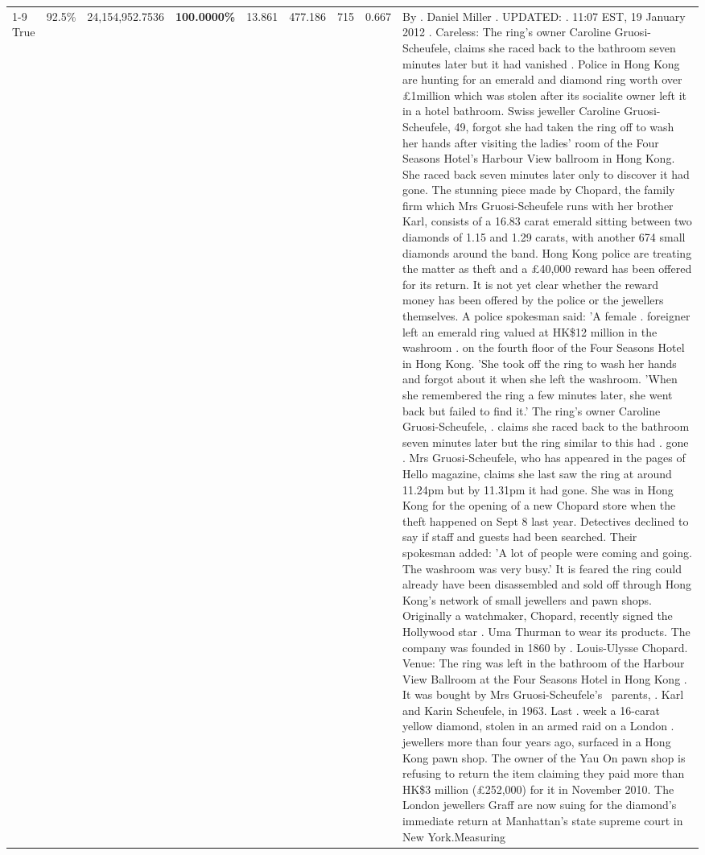 \begin{table}[H]
\begin{tabular}{lllrlllll}
\cline{1-9}
True & 92.5\% & 24,154,952.7536 & \bfseries \color{red} 100.0000\% & 13.861 & 477.186 & 715 & 0.667 & By . Daniel Miller . UPDATED: . 11:07 EST, 19 January 2012 . Careless: The ring's owner Caroline Gruosi-Scheufele, claims she raced back to the bathroom seven minutes later but it had vanished . Police in Hong Kong are hunting for an emerald and diamond ring worth over £1million which was stolen after its socialite owner left it in a hotel bathroom. Swiss jeweller Caroline Gruosi-Scheufele, 49, forgot she had taken the ring off to wash her hands after visiting the ladies' room of the Four Seasons Hotel's Harbour View ballroom in Hong Kong. She raced back seven minutes later only to discover it had gone. The stunning piece made by Chopard, the family firm which Mrs Gruosi-Scheufele runs with her brother Karl, consists of a 16.83 carat emerald sitting between two diamonds of 1.15 and 1.29 carats, with another 674 small diamonds around the band. Hong Kong police are treating the matter as theft and a £40,000 reward has been offered for its return. It is not yet clear whether the reward money has been offered by the police or the jewellers themselves. A police spokesman said: 'A female . foreigner left an emerald ring valued at HK\$12 million in the washroom . on the fourth floor of the Four Seasons Hotel in Hong Kong. 'She took off the ring to wash her hands and forgot about it when she left the washroom. 'When she remembered the ring a few minutes later, she went back but failed to find it.' The ring's owner Caroline Gruosi-Scheufele, . claims she raced back to the bathroom seven minutes later but the ring similar to this had . gone . Mrs Gruosi-Scheufele, who has appeared in the pages of Hello magazine, claims she last saw the ring at around 11.24pm but by 11.31pm it had gone. She was in Hong Kong for the opening of a new Chopard store when the theft happened on Sept 8 last year. Detectives declined to say if staff and guests had been searched. Their spokesman added: 'A lot of people were coming and going. The washroom was very busy.' It is feared the ring could already have been disassembled and sold off through Hong Kong's network of small jewellers and pawn shops. Originally a watchmaker, Chopard, recently signed the Hollywood star . Uma Thurman to wear its products. The company was founded in 1860 by . Louis-Ulysse Chopard. Venue: The ring was left in the bathroom of the Harbour View Ballroom at the Four Seasons Hotel in Hong Kong . It was bought by Mrs Gruosi-Scheufele's  parents, . Karl and Karin Scheufele, in 1963. Last . week a 16-carat yellow diamond, stolen in an armed raid on a London . jewellers more than four years ago, surfaced in a Hong Kong pawn shop. The owner of the Yau On pawn shop is refusing to return the item claiming they paid more than HK\$3 million (£252,000) for it in November 2010. The London jewellers Graff are now suing for the diamond’s immediate return at Manhattan’s state supreme court in New York.Measuring \\

\end{tabular}
\end{table}
